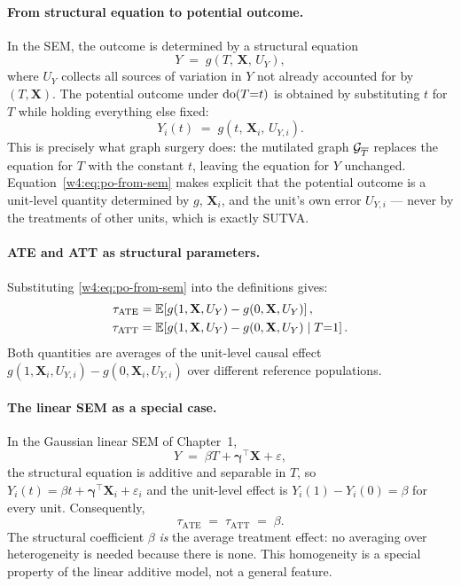 \documentclass[master.tex]{subfiles}
\begin{document}
\paragraph{From structural equation to potential outcome.}
In the SEM, the outcome is determined by a structural equation
\begin{equation}
  Y \;=\; g(T,\, \mathbf{X},\, U_Y),
  \label{w4:eq:sem-y}
\end{equation}
where $U_Y$ collects all sources of variation in $Y$ not already
accounted for by $(T, \mathbf{X})$.  The potential outcome under
$\mathrm{do}(T{=}t)$ is obtained by substituting $t$ for $T$ while holding
everything else fixed:
\begin{equation}
  Y_i(t) \;=\; g(t,\, \mathbf{X}_i,\, U_{Y,i}).
  \label{w4:eq:po-from-sem}
\end{equation}
This is precisely what graph surgery does: the mutilated graph
$\mathcal{G}_{\overline{T}}$ replaces the equation for $T$ with the constant
$t$, leaving the equation for $Y$ unchanged.  Equation~\eqref{w4:eq:po-from-sem}
makes explicit that the potential outcome is a unit-level quantity
determined by $g$, $\mathbf{X}_i$, and the unit's own error $U_{Y,i}$ ---
never by the treatments of other units, which is exactly SUTVA.

\paragraph{ATE and ATT as structural parameters.}
Substituting \eqref{w4:eq:po-from-sem} into the definitions gives:
\begin{align}
  \tau_{\mathrm{ATE}}
    &= \mathbb{E}\!\left[g(1, \mathbf{X}, U_Y) - g(0, \mathbf{X}, U_Y)\right],
    \label{w4:eq:ate-sem} \\
  \tau_{\mathrm{ATT}}
    &= \mathbb{E}\!\left[g(1, \mathbf{X}, U_Y) - g(0, \mathbf{X}, U_Y)
               \mid T{=}1\right].
    \label{w4:eq:att-sem}
\end{align}
Both quantities are averages of the unit-level causal effect
$g(1, \mathbf{X}_i, U_{Y,i}) - g(0, \mathbf{X}_i, U_{Y,i})$
over different reference populations.

\paragraph{The linear SEM as a special case.}
In the Gaussian linear SEM of Chapter~1,
\begin{equation}
  Y \;=\; \beta T + \boldsymbol{\gamma}^{\top}\mathbf{X} + \varepsilon,
  \label{w4:eq:linear-sem}
\end{equation}
the structural equation is additive and separable in $T$, so
$Y_i(t) = \beta t + \boldsymbol{\gamma}^{\top}\mathbf{X}_i + \varepsilon_i$
and the unit-level effect is $Y_i(1) - Y_i(0) = \beta$ for every unit.
Consequently,
\[
  \tau_{\mathrm{ATE}} \;=\; \tau_{\mathrm{ATT}} \;=\; \beta.
\]
The structural coefficient $\beta$ \emph{is} the average treatment effect:
no averaging over heterogeneity is needed because there is none.  This
homogeneity is a special property of the linear additive model, not a
general feature.
\end{document}
